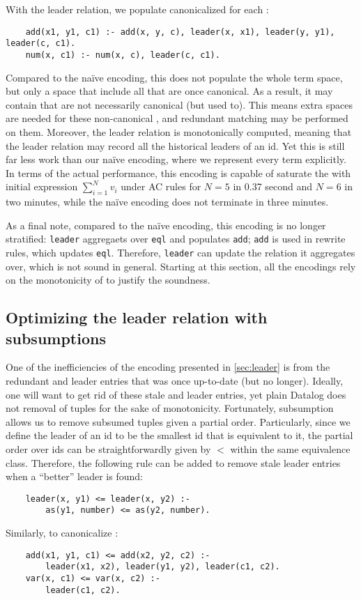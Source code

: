 With the leader relation, 
 we populate canonicalized \enodes 
 for each \enode:
\begin{verbatim}
    add(x1, y1, c1) :- add(x, y, c), leader(x, x1), leader(y, y1), leader(c, c1).
    num(x, c1) :- num(x, c), leader(c, c1).
\end{verbatim}
Compared to the na\"ive encoding,
 this does not populate the whole term space,
 but only a space that include all \enodes that are once canonical.
As a result,
 it may contain \enodes that are not necessarily canonical (but used to).
This means extra spaces are needed for these non-canonical \enodes,
 and redundant matching may be performed on them.
Moreover, the leader relation is monotonically computed,
 meaning that the leader relation may 
 record all the historical leaders of an \eclass id.
Yet this is still far less work than our na\"ive encoding, 
 where we represent every term explicitly.
In terms of the actual performance,
 this encoding is capable of saturate 
 the \egraph with initial expression $\sum_{i=1}^Nv_i$
 under AC rules for $N=5$ in 0.37 second
 and $N=6$ in two minutes, 
 while the na\"ive encoding does not terminate in three minutes.

As a final note,
 compared to the na\"ive encoding,
 this encoding is no longer stratified:
 \verb|leader| aggregaets over \verb|eql|
 and populates \verb|add|;
 \verb|add| is used in rewrite rules,
 which updates \verb|eql|.
Therefore, \verb|leader| can update the relation it aggregates over,
 which is not sound in general.
Starting at this section,
 all the encodings rely on the monotonicity of \egraphs to justify the soundness.

\subsection{Optimizing the leader relation with subsumptions}\label{sec:subsumption}

One of the inefficiencies of the encoding presented in \autoref{sec:leader} is 
 from the redundant \enodes and leader entries 
 that was once up-to-date (but no longer).
Ideally, one will want to get rid of these stale \enodes and leader entries,
 yet plain Datalog does not removal of tuples for the sake of monotonicity.
Fortunately,
 subsumption allows us to remove subsumed tuples given a partial order.
Particularly, 
 since we define the leader of an \eclass id to be the smallest id 
 that is equivalent to it,
 the partial order over \eclass ids can be straightforwardly given by $<$ 
 within the same equivalence class.
Therefore, the following rule can be added to remove stale leader entries 
 when a ``better'' leader is found:
\begin{verbatim}
    leader(x, y1) <= leader(x, y2) :-
        as(y1, number) <= as(y2, number).
\end{verbatim}
Similarly, to canonicalize \enodes:
\begin{verbatim}
    add(x1, y1, c1) <= add(x2, y2, c2) :-
        leader(x1, x2), leader(y1, y2), leader(c1, c2).
    var(x, c1) <= var(x, c2) :-
        leader(c1, c2).
\end{verbatim}

